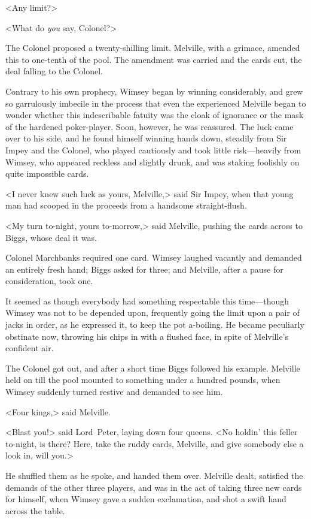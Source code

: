 <Any limit?>

<What do \textit{you} say, Colonel?>

The Colonel proposed a twenty-shilling limit. Melville, with a grimace, amended this to one-tenth of the pool. The amendment was carried and the cards cut, the deal falling to the Colonel.

Contrary to his own prophecy, Wimsey began by winning considerably, and grew so garrulously imbecile in the process that even the experienced Melville began to wonder whether this indescribable fatuity was the cloak of ignorance or the mask of the hardened poker-player. Soon, however, he was reassured. The luck came over to his side, and he found himself winning hands down, steadily from Sir Impey and the Colonel, who played cautiously and took little risk—heavily from Wimsey, who appeared reckless and slightly drunk, and was staking foolishly on quite impossible cards.

<I never knew such luck as yours, Melville,> said Sir Impey, when that young man had scooped in the proceeds from a handsome straight-flush.

<My turn to-night, yours to-morrow,> said Melville, pushing the cards across to Biggs, whose deal it was.

Colonel Marchbanks required one card. Wimsey laughed vacantly and demanded an entirely fresh hand; Biggs asked for three; and Melville, after a pause for consideration, took one.

It seemed as though everybody had something respectable this time—though Wimsey was not to be depended upon, frequently going the limit upon a pair of jacks in order, as he expressed it, to keep the pot a-boiling. He became peculiarly obstinate now, throwing his chips in with a flushed face, in spite of Melville's confident air.

The Colonel got out, and after a short time Biggs followed his example. Melville held on till the pool mounted to something under a hundred pounds, when Wimsey suddenly turned restive and demanded to see him.

<Four kings,> said Melville.

<Blast you!> said Lord~Peter, laying down four queens. <No holdin' this feller to-night, is there? Here, take the ruddy cards, Melville, and give somebody else a look in, will you.>

He shuffled them as he spoke, and handed them over. Melville dealt, satisfied the demands of the other three players, and was in the act of taking three new cards for himself, when Wimsey gave a sudden exclamation, and shot a swift hand across the table.

